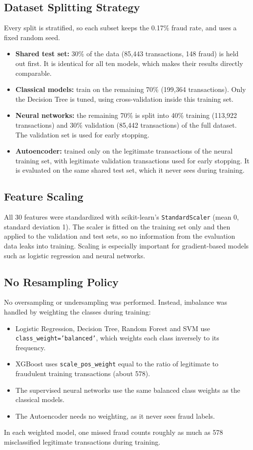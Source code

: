 \documentclass[journal]{IEEEtran}
\begin{document}
\subsection{Dataset Splitting Strategy}
Every split is stratified, so each subset keeps the 0.17\% fraud rate, and uses a fixed random seed.
\begin{itemize}
  \item \textbf{Shared test set:} 30\% of the data (85,443 transactions, 148 fraud) is held out first. It is identical for all ten models, which makes their results directly comparable.
  \item \textbf{Classical models:} train on the remaining 70\% (199,364 transactions). Only the Decision Tree is tuned, using cross-validation inside this training set.
  \item \textbf{Neural networks:} the remaining 70\% is split into 40\% training (113,922 transactions) and 30\% validation (85,442 transactions) of the full dataset. The validation set is used for early stopping.
  \item \textbf{Autoencoder:} trained only on the legitimate transactions of the neural training set, with legitimate validation transactions used for early stopping. It is evaluated on the same shared test set, which it never sees during training.
\end{itemize}

\subsection{Feature Scaling}
All 30 features were standardized with scikit-learn's \texttt{StandardScaler} (mean 0, standard deviation 1). The scaler is fitted on the training set only and then applied to the validation and test sets, so no information from the evaluation data leaks into training. Scaling is especially important for gradient-based models such as logistic regression and neural networks.

\subsection{No Resampling Policy}
No oversampling or undersampling was performed. Instead, imbalance was handled by weighting the classes during training:
\begin{itemize}
  \item Logistic Regression, Decision Tree, Random Forest and SVM use \texttt{class\_weight='balanced'}, which weights each class inversely to its frequency.
  \item XGBoost uses \texttt{scale\_pos\_weight} equal to the ratio of legitimate to fraudulent training transactions (about 578).
  \item The supervised neural networks use the same balanced class weights as the classical models.
  \item The Autoencoder needs no weighting, as it never sees fraud labels.
\end{itemize}
In each weighted model, one missed fraud counts roughly as much as 578 misclassified legitimate transactions during training.
\end{document}
